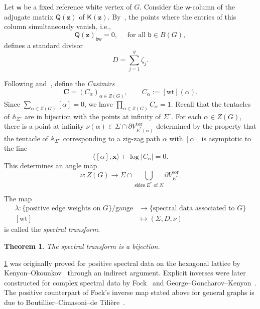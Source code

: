 \documentclass[12pt]{amsart}
\numberwithin{equation}{section}
\newtheorem{theorem}{Theorem}[section]
\theoremstyle{definition}
\newcommand{\C}{\mathbb{C}}
\newcommand{\R}{\mathbb{R}}
\def\Gtor{G}
\def\blackvertices{B}
\newcommand{\wt}{\mathrm{wt}}
\def\divisor{D}
\def\casimir{C}
\def\bw{\mathsf{w}}
\def\bb{\mathsf{b}}
\def\bQ{\mathsf{Q}}
\def\bK{\mathsf{K}}
\def\zzG{{{Z}(G)}}
\def\spectralcurve{\Sigma}
\def\openspectralcurve{{\Sigma^{\circ}}}
\def\amoeba{\mathbb A}
\def\divisor{D}
\def\veccasimirs{\bm{C}}
\def\ptR{{\bm{x}}} %
\def\ptC{{\bm{z}}} %
\def\<{\langle}
\def\>{\rangle}
\def\Eside{{E^\ast}}
\def\divptgeom{\zeta}
\def\amoebaof#1{\amoeba_{#1}}
\def\amoebaSig{\amoebaof{\openspectralcurve}}
\def\mcurve{\Sigma}
\begin{document}
Let $\bw$ be a fixed reference white vertex of $\Gtor$. Consider the $\bw$-column of the adjugate matrix 
$\bQ(\ptC)$ of $\bK(\ptC)$. By~\cite{KenyonOkounkovHarnack}, the points where the entries of this column simultaneously vanish, i.e.,
\[
\bQ(\ptC)_{\bb\bw} = 0, \quad \text{ for all }\bb \in \blackvertices(\Gtor),
\]
defines a standard divisor 
\[\divisor = \sum_{j=1}^g \divptgeom_j.\] 

Following \cite[Section~7.2]{GK} and~\cite[Section~3.1]{KenyonOkounkovHarnack}, define the \emph{Casimirs} \[\veccasimirs = (\casimir_\alpha)_{ \alpha \in \zzG }, \qquad
\casimir_\alpha := [\wt](\alpha). 
\]
Since $\sum_{\alpha \in \zzG} [\alpha]=0$, we have
$
\prod_{\alpha \in \zzG} \casimir_\alpha = 1.
$ 
Recall that the tentacles of $\amoebaSig$ are in bijection with the points at infinity of $\openspectralcurve$. For each $\alpha \in \zzG$, there is a point at infinity $\nu(\alpha) \in \mcurve \cap \partial V^{\mathrm{tor}}_{\Eside(\alpha)}$ determined by the property that the tentacle of $\amoebaSig$ corresponding to a zig-zag path $\alpha$ with $[\alpha]$ is asymptotic to the line \begin{equation}\label{eq:tentacles}
\< [\alpha], \ptR \> + \log |\casimir_\alpha| = 0.
\end{equation}
This determines an angle map
\[
\nu:\zzG \to \mcurve \cap \bigcup_{\text{sides $\Eside$ of $N$}} \partial V^{\mathrm{tor}}_\Eside.
\]

The map
\begin{align*}
 \lambda: \{\text{positive edge weights on $\Gtor$}\}/\text{gauge} & \to \{\text{spectral data associated to $\Gtor$}\}\\
[\wt]&\mapsto(\spectralcurve,\divisor,\nu)
\end{align*}
is called the \emph{spectral transform}.

\begin{theorem}\label{thm:spectral_transform_birational}
  The spectral transform is a bijection.
\end{theorem}

\cref{thm:spectral_transform_birational} was originally proved for positive spectral data on the hexagonal lattice by Kenyon--Okounkov~\cite{KenyonOkounkovHarnack} through an indirect argument. Explicit inverses were later constructed for complex spectral data by Fock~\cite{Fock} and George--Goncharov--Kenyon~\cite{GGK}. The positive counterpart of Fock’s inverse map stated above for general graphs is due to Boutillier--Cimasoni--de Tili\`ere~\cite{BDdT}.
\end{document}
